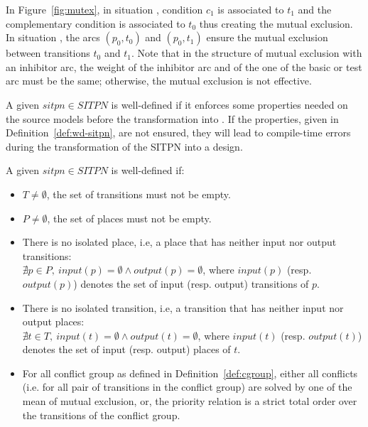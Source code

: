 In Figure~\ref{fig:mutex}, in situation , condition $c_1$
is associated to $t_1$ and the complementary condition is associated
to $t_0$ thus creating the mutual exclusion. In situation ,
the arcs $(p_0,t_0)$ and $(p_0,t_1)$ ensure the mutual exclusion
between transitions $t_0$ and $t_1$. Note that in the structure of
mutual exclusion with an inhibitor arc, the weight of the inhibitor
arc and of the one of the basic or test arc must be the same;
otherwise, the mutual exclusion is not effective.

A given $sitpn\in{}SITPN$ is well-defined if it enforces some
properties needed on the \hilecop{} source models before the
transformation into \vhdl{}. If the properties, given in
Definition~\ref{def:wd-sitpn}, are not ensured, they will lead to
compile-time errors during the transformation of the SITPN into a
\vhdl{} design.

\begin{definition}\label{def:wd-sitpn}
  A given $sitpn\in{}SITPN$ is well-defined if:
  \begin{itemize}
  \item $T\neq\emptyset$, the set of transitions must not be empty.
  \item $P\neq\emptyset$, the set of places must not be empty.
  \item There is no isolated place, i.e, a place that has neither
    input nor output transitions:\\
    $\nexists{}p\in{}P,~input(p)=\emptyset\wedge{}output(p)=\emptyset$,
    where $input(p)$ (resp. $output(p)$) denotes the set of input
    (resp. output) transitions of $p$.
  \item There is no isolated transition, i.e, a transition that has
    neither
    input nor output places:\\
    $\nexists{}t\in{}T,~input(t)=\emptyset\wedge{}output(t)=\emptyset$,
    where $input(t)$ (resp. $output(t)$) denotes the set of input
    (resp. output) places of $t$.
  \item For all conflict group as defined in
    Definition~\ref{def:cgroup}, either all conflicts (i.e. for all
    pair of transitions in the conflict group) are solved by one of
    the mean of mutual exclusion, or, the priority relation is a
    strict total order over the transitions of the conflict group.
  \end{itemize}
\end{definition}



